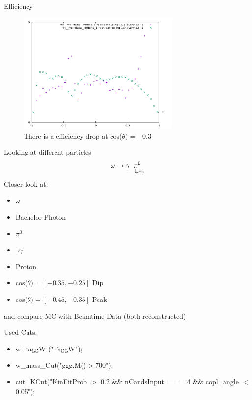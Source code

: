 \documentclass[
		10pt
		]{beamer}
\begin{document}
\begin{frame}{Efficiency}
	\centering
	\begin{figure}
		\includegraphics[width=8cm]{Plots/Cross-Section40.pdf}
		\caption{There is a efficiency drop at cos($\theta)=-0.3$}
	\end{figure}
\end{frame}

\begin{frame}{Looking at different particles}
	\begin{equation}
		\omega \rightarrow \gamma \underset{\hspace{0.25cm}\rotatebox[origin=c]{180}{$\Lsh$} \gamma \gamma 	}{\pi^0}
	\end{equation}
	Closer look at:
	 
	 \begin{multicols}{2}
	
		\begin{itemize}
		
			\item $\omega$
			\item Bachelor Photon
			\item $\pi^0$
			\item $\gamma \gamma$
			\item Proton
			\item cos($\theta)=[-0.35,-0.25]$ Dip
			\item cos($\theta)=[-0.45,-0.35]$ Peak	
		
	
		\end{itemize}
	\end{multicols}

	and compare MC with Beamtime Data (both reconstructed)

	Used Cuts:

	\begin{itemize}
		\item  w\_taggW ("TaggW");
		\item  w\_mass\_Cut("ggg.M()$>$700");
		\item  cut\_KCut("KinFitProb $>$ 0.2 \&\& nCandsInput $==$ 4 \&\& copl\_angle $<$ 0.05");
	\end{itemize}



\end{frame}
\end{document}
